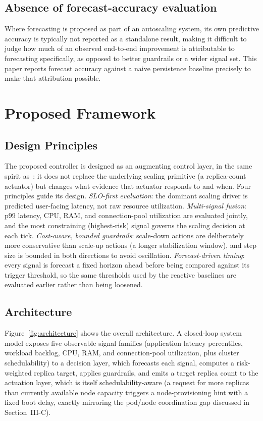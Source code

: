 \documentclass[conference]{IEEEtran}
\begin{document}
\subsection{Absence of forecast-accuracy evaluation}
Where forecasting is proposed as part of an autoscaling system, its own predictive accuracy is
typically not reported as a standalone result, making it difficult to judge how much of an observed
end-to-end improvement is attributable to forecasting specifically, as opposed to better guardrails or
a wider signal set. This paper reports forecast accuracy against a naive persistence baseline
precisely to make that attribution possible.

\section{Proposed Framework}

\subsection{Design Principles}
The proposed controller is designed as an augmenting control layer, in the same spirit
as~\cite{ref_base}: it does not replace the underlying scaling primitive (a replica-count actuator) but
changes what evidence that actuator responds to and when. Four principles guide its design.
\emph{SLO-first evaluation}: the dominant scaling driver is predicted user-facing latency, not raw
resource utilization. \emph{Multi-signal fusion}: p99 latency, CPU, RAM, and connection-pool
utilization are evaluated jointly, and the most constraining (highest-risk) signal governs the scaling
decision at each tick. \emph{Cost-aware, bounded guardrails}: scale-down actions are deliberately more
conservative than scale-up actions (a longer stabilization window), and step size is bounded in both
directions to avoid oscillation. \emph{Forecast-driven timing}: every signal is forecast a fixed
horizon ahead before being compared against its trigger threshold, so the same thresholds used by the
reactive baselines are evaluated earlier rather than being loosened.

\subsection{Architecture}

Figure~\ref{fig:architecture} shows the overall architecture. A closed-loop system model exposes five
observable signal families (application latency percentiles, workload backlog, CPU, RAM, and
connection-pool utilization, plus cluster schedulability) to a decision layer, which forecasts each
signal, computes a risk-weighted replica target, applies guardrails, and emits a target replica count
to the actuation layer, which is itself schedulability-aware (a request for more replicas than
currently available node capacity triggers a node-provisioning hint with a fixed boot delay, exactly
mirroring the pod/node coordination gap discussed in Section~III-C).
\end{document}
